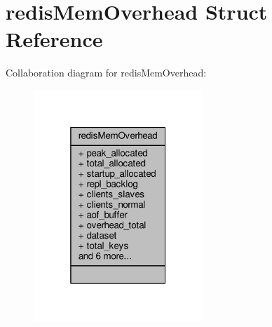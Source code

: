 \hypertarget{structredisMemOverhead}{}\section{redis\+Mem\+Overhead Struct Reference}
\label{structredisMemOverhead}


Collaboration diagram for redis\+Mem\+Overhead\+:\nopagebreak
\begin{figure}[H]
\begin{center}
\leavevmode
\includegraphics[width=181pt]{structredisMemOverhead__coll__graph}
\end{center}
\end{figure}
